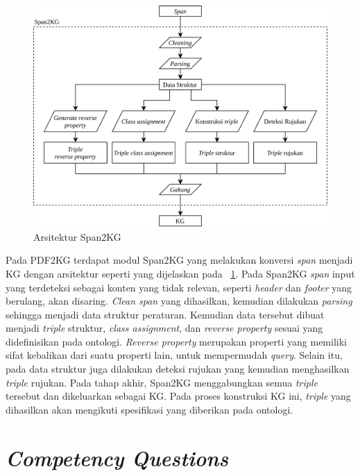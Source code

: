 \begin{figure}
  \centering
  \includegraphics[width=\textwidth]{pictures/span2kg.png}
  \caption{Arsitektur Span2KG}
  \label{fig:span2kg}
\end{figure}

Pada PDF2KG terdapat modul Span2KG yang melakukan konversi \textit{span} menjadi KG dengan
arsitektur seperti yang dijelaskan pada \pic~\ref{fig:span2kg}. Pada Span2KG \textit{span} input
yang terdeteksi sebagai konten yang tidak relevan, seperti \textit{header} dan \textit{footer} yang
berulang, akan disaring. \textit{Clean span} yang dihasilkan, kemudian dilakukan \textit{parsing}
sehingga menjadi data struktur peraturan. Kemudian data tersebut dibuat menjadi \textit{triple}
struktur, \textit{class assignment}, dan \textit{reverse property} sesuai yang didefinisikan pada
ontologi. \textit{Reverse property} merupakan properti yang memiliki sifat kebalikan dari suatu
properti lain, untuk mempermudah \textit{query}. Selain itu, pada data struktur juga dilakukan
deteksi rujukan yang kemudian menghasilkan \textit{triple} rujukan. Pada tahap akhir, Span2KG
menggabungkan semua \textit{triple} tersebut dan dikeluarkan sebagai KG. Pada proses konstruksi KG
ini, \textit{triple} yang dihasilkan akan mengikuti spesifikasi yang diberikan pada ontologi.

\section{\textit{Competency Questions}}
\label{sec:competency-questions}

